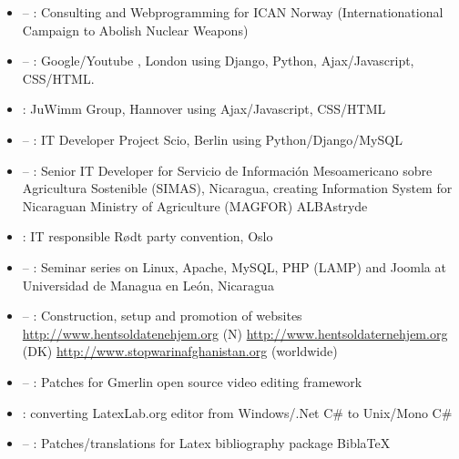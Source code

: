 \begin{itemize}
\item {} – : Consulting and Webprogramming for ICAN Norway (Internationational Campaign to Abolish Nuclear Weapons)
\item {} – : Google/Youtube \UK, London using Django, Python, Ajax/Javascript, CSS/HTML.
\item {}: JuWimm Group, Hannover using Ajax/Javascript, CSS/HTML
\item {} – : IT Developer Project Scio, Berlin using Python/Django/MySQL
\item {} – : Senior IT Developer for Servicio de Información Mesoamericano sobre Agricultura Sostenible (SIMAS), Nicaragua, creating  Information System for Nicaraguan Ministry of Agriculture (MAGFOR) ALBAstryde
\item {}: IT responsible Rødt party convention, Oslo
\item {} – : Seminar series on Linux, Apache, MySQL, PHP (LAMP) and Joomla at Universidad de Managua en León, Nicaragua
\item {} – : Construction, setup and promotion of websites \href{http://www.hentsoldatenehjem.org}{http://www.hentsoldatenehjem.org} (N) \href{http://www.hentsoldaternehjem.org}{http://www.hentsoldaternehjem.org} (DK) \href{http://www.stopwarinafghanistan.org}{http://www.stopwarinafghanistan.org} (worldwide)
\item {} – : Patches for Gmerlin open source video editing framework
\item {}: converting LatexLab.org editor from Windows/.Net C\# to Unix/Mono C\#
\item {} – : Patches/translations for Latex bibliography package BiblaTeX


\end{itemize}
